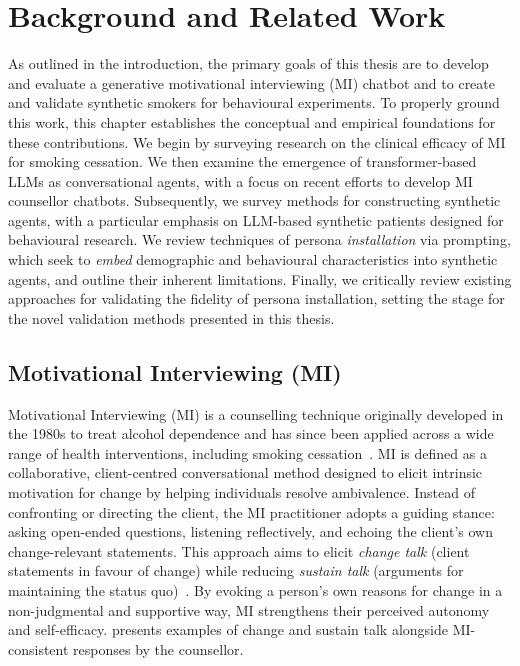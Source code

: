\chapter{Background and Related Work}
\label{ch:background}
As outlined in the introduction, the primary goals of this thesis are to develop and evaluate a generative motivational interviewing (MI) chatbot and to create and validate synthetic smokers for behavioural experiments. To properly ground this work, this chapter establishes the conceptual and empirical foundations for these contributions. We begin by surveying research on the clinical efficacy of MI for smoking cessation. We then examine the emergence of transformer-based LLMs as conversational agents, with a focus on recent efforts to develop MI counsellor chatbots. Subsequently, we survey methods for constructing synthetic agents, with a particular emphasis on LLM-based synthetic patients designed for behavioural research. We review techniques of persona \emph{installation} via prompting, which seek to \emph{embed} demographic and behavioural characteristics into synthetic agents, and outline their inherent limitations. Finally, we critically review existing approaches for validating the fidelity of persona installation, setting the stage for the novel validation methods presented in this thesis.


\section{Motivational Interviewing (MI)}
Motivational Interviewing (MI) is a counselling technique originally developed in the 1980s to treat alcohol dependence and has since been applied across a wide range of health interventions, including smoking cessation~\cite{Miller1983, MillerRollnick2023}. MI is defined as a collaborative, client-centred conversational method designed to elicit intrinsic motivation for change by helping individuals resolve ambivalence. Instead of confronting or directing the client, the MI practitioner adopts a guiding stance: asking open-ended questions, listening reflectively, and echoing the client's own change-relevant statements. This approach aims to elicit \emph{change talk} (client statements in favour of change) while reducing \emph{sustain talk} (arguments for maintaining the status quo)~\cite{MillerRose2009}. By evoking a person's own reasons for change in a non-judgmental and supportive way, MI strengthens their perceived autonomy and self-efficacy.  presents examples of change and sustain talk alongside MI-consistent responses by the counsellor.


